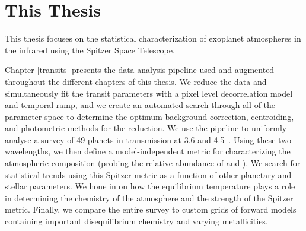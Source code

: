 

\section{This Thesis} %

This thesis focuses on the statistical characterization of exoplanet atmospheres in the infrared using the Spitzer Space Telescope.

Chapter \ref{transits} presents the data analysis pipeline used and augmented throughout the different chapters of this thesis. We reduce the data and simultaneously fit the transit parameters \citep[using Batman;][]{Kreidberg2015} with a pixel level decorrelation model and temporal ramp, and we create an automated search through all of the parameter space to determine the optimum background correction, centroiding, and photometric methods for the reduction. We use the pipeline to uniformly analyse a survey of 49 planets in transmission at 3.6 and 4.5~\um. Using these two wavelengths, we then define a model-independent metric for characterizing the atmospheric composition (probing the relative abundance of  and ). We search for statistical trends using this Spitzer metric as a function of other planetary and stellar parameters. We hone in on how the equilibrium temperature plays a role in determining the chemistry of the atmosphere and the strength of the Spitzer metric. Finally, we compare the entire survey to custom grids of forward models containing important disequilibrium chemistry and varying metallicities.

